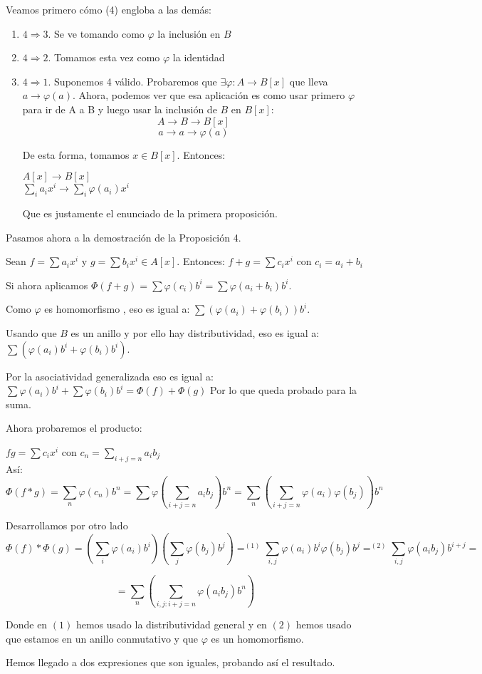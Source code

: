 \documentclass[11pt, a4paper, titlepage]{article}
\makeatletter
\renewenvironment{proof}[1][\proofname] {\vspace{-15pt}\par\pushQED{\qed}\normalfont\topsep6\p@\@plus6\p@\relax\trivlist\item[\hskip\labelsep\it#1\@addpunct{.}]\ignorespaces}{\popQED\endtrivlist\@endpefalse}
\theoremstyle{theorem-style}
\theoremstyle{definition-style}
\theoremstyle{remark-style}
\theoremstyle{example-style}
\newenvironment{nlist}
{\begin{enumerate}
\renewcommand\labelenumi{(\emph{\roman{enumi})}}}
{\end{enumerate}}
\makeatother
\begin{document}
\begin{proof}
Veamos primero cómo (4) engloba a las demás:
\begin{nlist}

\item $4 \Rightarrow 3$. Se ve tomando como $\varphi$ la inclusión en $B$
\item $4 \Rightarrow 2$. Tomamos esta vez como $\varphi$ la identidad
\item $4 \Rightarrow 1$. Suponemos 4 válido. Probaremos que $\exists\varphi: A \to B[x]$ que lleva $a \to \varphi(a)$.
Ahora, podemos ver que esa aplicación es como usar primero $\varphi$ para ir de A a B y luego usar la inclusión de $B$ en $B[x]$:
\[
A\to B \to B[x]
\]
\[
a \to a \to \varphi(a)
\]

De esta forma, tomamos $x\in B[x]$. Entonces:
\begin{center}
	$A[x]\to B[x]$\\
	$\sum_i a_i x^i \to \sum_i \varphi(a_i)x^i$
\end{center}

Que es justamente el enunciado de la primera proposición.

\end{nlist}

Pasamos ahora a la demostración de la Proposición 4.


Sean $f = \sum a_i x^i$ y $g = \sum b_i x^i \in A[x]$. Entonces: $f+g = \sum c_i x^i$ con $c_i = a_i + b_i$

Si ahora aplicamos $\Phi(f+g) = \sum \varphi(c_i)b^i = \sum \varphi(a_i + b_i)b^i$. 

Como $\varphi$ es homomorfismo , eso es igual a:
 $\sum (\varphi(a_i) + \varphi(b_i))b^i$.
 
 Usando que $B$ es un anillo y por ello hay distributividad, eso es igual a: $\sum (\varphi(a_i)b^i + \varphi(b_i)b^i)$.
 
 Por la asociatividad generalizada eso es igual a: $\sum \varphi(a_i)b^i + \sum \varphi(b_i)b^i = \Phi(f) + \Phi(g)$ Por lo que queda probado para la suma.
 
 Ahora probaremos el producto:
 
 $fg = \sum c_i x^i$ con $c_n  = \sum_{i+j = n} a_ib_j$\\
 
 Así: \[\Phi(f*g) = \sum_n\varphi(c_n)b^n = \sum \varphi(\sum_{i+j = n} a_ib_j)b^n = \sum_n ( \sum_{i+j = n} \varphi(a_i)\varphi(b_j))b^n\]
 
 Desarrollamos por otro lado
 \[
 \Phi(f) * \Phi(g) = (\sum_i \varphi(a_i)b^i)(\sum_j \varphi(b_j)b^j) =^{(1)} \sum_{i,j} \varphi(a_i)b^i\varphi(b_j)b^j =^{(2)} \sum_{i,j} \varphi(a_ib_j)b^{i+j}=
 \]
 
 \[
  = \sum_n(\sum_{i,j: i+j = n} \varphi(a_ib_j)b^n)
 \]
 
 Donde en $(1)$ hemos usado la distributividad general y en $(2)$ hemos usado que estamos en un anillo conmutativo y que $\varphi$ es un homomorfismo. 
 
 Hemos llegado a dos expresiones que son iguales, probando así el resultado.
 
\end{proof}
\end{document}
